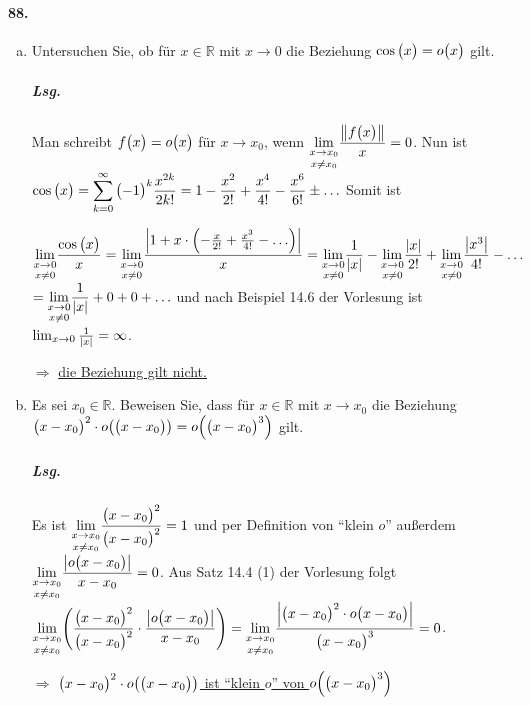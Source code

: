 \documentclass{scrreprt}
\begin{document}
\paragraph{88.}
\begin{enumerate}[(a)]
\item Untersuchen Sie, ob für $x \in \mathbb{R}$ mit $x \to 0$ die Beziehung
  $\cos\qty\big(x) = o\qty\big(x)$ gilt.
  \subparagraph{Lsg.} Man schreibt $f\qty\big(x) = o\qty\big(x)$ für $x \to x_0$,
  wenn $\displaystyle \underset{x \ne x_0}{\lim_{x \to x_0}}
  \frac{\norm{f\qty\big(x)}}{x} = 0$.
  Nun ist $\displaystyle \cos\qty\big(x) =
  \sum_{k = 0}^{\infty} \qty\big(-1)^k \frac{x^{2k}}{2k!} =
  1 - \frac{x^2}{2!} + \frac{x^4}{4!} - \frac{x^6}{6!} \pm \ldots$
  Somit ist

  $\displaystyle \underset{x \ne 0}{\lim_{x \to 0}}
  \frac{\cos\qty\big(x)}{x} = \underset{x \ne 0}{\lim_{x \to 0}}
  \frac{\abs{1 + x \cdot \qty(-\frac{x}{2!} + \frac{x^3}{4!} - \ldots)}}{x}
  = \underset{x \ne 0}{\lim_{x \to 0}} \frac{1}{\abs{x}} -
  \underset{x \ne 0}{\lim_{x \to 0}} \frac{\abs{x}}{2!} +
  \underset{x \ne 0}{\lim_{x \to 0}} \frac{\abs{x^3}}{4!} - \ldots$
  $\displaystyle = \underset{x \ne 0}{\lim_{x \to 0}} \frac{1}{\abs{x}} +
  0 + 0 + \ldots$
  und nach Beispiel 14.6 der Vorlesung ist
  $\lim_{x \to 0} \frac{1}{\abs{x}} = \infty$.

  $\Rightarrow$ \underline{die Beziehung gilt nicht.}

\item Es sei $x_0 \in \mathbb{R}$.
  Beweisen Sie, dass für $x \in \mathbb{R}$ mit $x \to x_0$ die Beziehung \\
  $\qty\big(x - x_0)^2 \cdot o\qty\big(\qty\big(x - x_0)) =
    o\qty\Big(\qty\big(x - x_0)^3)$ gilt.
  \subparagraph{Lsg.} Es ist
  $\displaystyle \underset{x \ne x_0}{\lim_{x \to x_0}}
  \frac{\qty\big(x - x_0)^2}{\qty\big(x - x_0)^2} = 1$
  und per Definition von ``klein $o$'' außerdem
  $\displaystyle \underset{x \ne x_0}{\lim_{x \to x_0}}
  \frac{\abs{o\qty\big(x - x_0)}}{x - x_0} = 0$.
  Aus Satz 14.4 (1) der Vorlesung folgt
  $\displaystyle \underset{x \ne x_0}{\lim_{x \to x_0}}
  \qty(\frac{\qty\big(x - x_0)^2}{\qty\big(x - x_0)^2} \cdot
  \frac{\abs{o\qty\big(x - x_0)}}{x - x_0}) =
  \underset{x \ne x_0}{\lim_{x \to x_0}}
  \frac{\abs{\qty\big(x - x_0)^2 \cdot o\qty\big(x - x_0)}}{\qty\big(x - x_0)^3}
  = 0$.

  $\Rightarrow$ \underline{
    $\qty\big(x - x_0)^2 \cdot o\qty\big(\qty\big(x - x_0))$ ist ``klein $o$''
    von $o\qty\Big(\qty\big(x - x_0)^3)$}
\end{enumerate}
\end{document}

